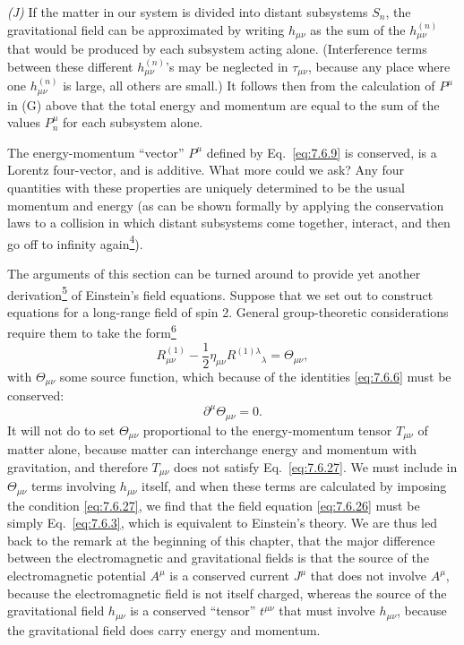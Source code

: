 \medskip
\noindent\textit{(J)} If the matter in our system is divided into distant
subsystems \(S_n\), the gravitational field can be approximated by writing
\(h_{\mu\nu}\) as the sum of the \(h_{\mu\nu}^{(n)}\) that would be
produced by each subsystem acting alone. (Interference terms between these
different \(h_{\mu\nu}^{(n)}\)'s may be neglected in \(\tau_{\mu\nu}\),
because any place where one \(h_{\mu\nu}^{(n)}\) is large, all others are
small.) It follows then from the calculation of \(P^\mu\) in (G) above
that the total energy and momentum are equal to the sum of the values
\(P_n^\mu\) for each subsystem alone.

The energy-momentum ``vector'' \(P^\mu\) defined by Eq.~\eqref{eq:7.6.9}
is conserved, is a Lorentz four-vector, and is additive. What more could we
ask? Any four quantities with these properties are uniquely determined to
be the usual momentum and energy (as can be shown formally by applying the
conservation laws to a collision in which distant subsystems come together,
interact, and then go off to infinity
again\hyperref[ch7-ref-4]{\textsuperscript{4}}).

The arguments of this section can be turned around to provide yet another
derivation\hyperref[ch7-ref-5]{\textsuperscript{5}} of Einstein's field
equations. Suppose that we set out to construct equations for a long-range
field of spin 2. General group-theoretic considerations require them to take
the form\hyperref[ch7-ref-6]{\textsuperscript{6}}
\begin{equation}
  R^{(1)}_{\mu\nu}
  -\frac12\eta_{\mu\nu}R^{(1)\lambda}{}_\lambda
  =
  \Theta_{\mu\nu},
  \tag{7.6.26}\label{eq:7.6.26}
\end{equation}
with \(\Theta_{\mu\nu}\) some source function, which because of the
identities \eqref{eq:7.6.6} must be conserved:
\begin{equation}
  \partial^\mu\Theta_{\mu\nu}=0.
  \tag{7.6.27}\label{eq:7.6.27}
\end{equation}
It will not do to set \(\Theta_{\mu\nu}\) proportional to the
energy-momentum tensor \(T_{\mu\nu}\) of matter alone, because matter can
interchange energy and momentum with gravitation, and therefore
\(T_{\mu\nu}\) does not satisfy Eq.~\eqref{eq:7.6.27}. We must include in
\(\Theta_{\mu\nu}\) terms involving \(h_{\mu\nu}\) itself, and when these
terms are calculated by imposing the condition \eqref{eq:7.6.27}, we find
that the field equation \eqref{eq:7.6.26} must be simply
Eq.~\eqref{eq:7.6.3}, which is equivalent to Einstein's theory. We are thus
led back to the remark at the beginning of this chapter, that the major
difference between the electromagnetic and gravitational fields is that
the source of the electromagnetic potential \(A^\mu\) is a conserved
current \(J^\mu\) that does not involve \(A^\mu\), because the
electromagnetic field is not itself charged, whereas the source of the
gravitational field \(h_{\mu\nu}\) is a conserved ``tensor''
\(t^{\mu\nu}\) that must involve \(h_{\mu\nu}\), because the gravitational
field does carry energy and momentum.
